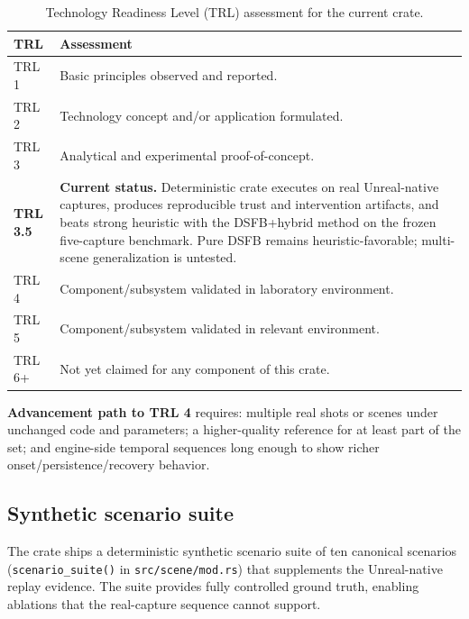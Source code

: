 \documentclass[11pt,letterpaper]{article}
\theoremstyle{gcresult}
\theoremstyle{definition}
\begin{document}
\begin{table}[H]
\centering
\caption{Technology Readiness Level (TRL) assessment for the current crate.}
\label{tab:trl}
\small
\begin{tabular}{p{1.5cm} p{10cm}}
\toprule
TRL & Assessment \\
\midrule
TRL 1 & Basic principles observed and reported. \\
TRL 2 & Technology concept and/or application formulated. \\
TRL 3 & Analytical and experimental proof-of-concept. \\
\textbf{TRL 3.5} & \textbf{Current status.} Deterministic crate executes on real Unreal-native captures, produces reproducible trust and intervention artifacts, and beats strong heuristic with the DSFB+hybrid method on the frozen five-capture benchmark. Pure DSFB remains heuristic-favorable; multi-scene generalization is untested. \\
TRL 4 & Component/subsystem validated in laboratory environment. \\
TRL 5 & Component/subsystem validated in relevant environment. \\
TRL 6+ & Not yet claimed for any component of this crate. \\
\bottomrule
\end{tabular}
\end{table}

\noindent\textbf{Advancement path to TRL 4} requires: multiple real shots or scenes under unchanged code and parameters; a higher-quality reference for at least part of the set; and engine-side temporal sequences long enough to show richer onset/persistence/recovery behavior.

\subsection{Synthetic scenario suite}
\label{sec:scenario-suite}

The crate ships a deterministic synthetic scenario suite of ten canonical scenarios (\texttt{scenario\_suite()} in \texttt{src/scene/mod.rs}) that supplements the Unreal-native replay evidence. The suite provides fully controlled ground truth, enabling ablations that the real-capture sequence cannot support.
\end{document}

